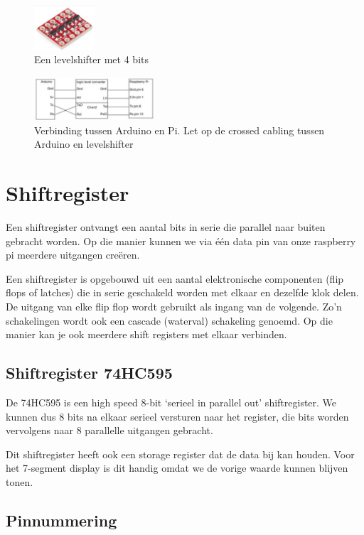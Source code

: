 \documentclass{article}
\begin{document}
\begin{figure}[H]
    \centering
    \includegraphics[width=0.2\textwidth]{levelshifter.png}
    \caption{Een levelshifter met 4 bits}
\end{figure}

\begin{figure}[H]
    \centering
    \includegraphics[width=0.4\textwidth]{levelshifter-arduino.png}
    \caption{Verbinding tussen Arduino en Pi. Let op de crossed cabling tussen Arduino en levelshifter}
\end{figure}

\section{Shiftregister}
Een shiftregister ontvangt een aantal bits in serie die parallel naar buiten gebracht worden. 
Op die manier kunnen we via één data pin van onze raspberry pi meerdere uitgangen creëren.

Een shiftregister is opgebouwd uit een aantal elektronische componenten (flip flops of latches) die in serie
geschakeld worden met elkaar en dezelfde klok delen. De uitgang van elke flip flop wordt gebruikt als ingang van de volgende. Zo’n schakelingen wordt ook een
cascade (waterval) schakeling genoemd. Op die manier kan je ook meerdere shift registers met elkaar
verbinden.

\subsection{Shiftregister 74HC595}
De 74HC595 is een high speed 8-bit `serieel in parallel out' shiftregister.
We kunnen dus 8 bits na elkaar serieel versturen naar het register, 
die bits worden vervolgens naar 8 parallelle uitgangen gebracht.

Dit shiftregister heeft ook een storage register dat de data bij kan houden. 
Voor het 7-segment display is dit handig omdat we de vorige waarde kunnen blijven tonen.

\subsection{Pinnummering}
\end{document}
